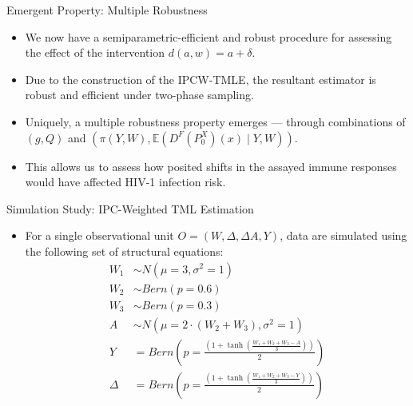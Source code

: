 \documentclass{beamer}
\newcommand{\E}{\mathbb{E}}
\begin{document}

\begin{frame}[c]{Emergent Property: Multiple Robustness}

\begin{center}
\begin{itemize}
  \itemsep10pt
  \item We now have a semiparametric-efficient and robust procedure for
    assessing the effect of the intervention $d(a,w) = a + \delta$.
  \item Due to the construction of the IPCW-TMLE, the resultant estimator is
    robust and efficient under two-phase sampling.
  \item Uniquely, a multiple robustness property emerges --- through
    combinations of $(g, Q)$ and $(\pi(Y, W), \E(D^F(P^X_0)(x) \mid Y, W))$.
  \item This allows us to assess how posited shifts in the assayed immune
    responses would have affected HIV-1 infection risk.
\end{itemize}
\end{center}

\note{
}

\end{frame}


\begin{frame}[c]{Simulation Study: IPC-Weighted TML Estimation}

\begin{center}
\begin{itemize}
  \itemsep10pt
  \item For a single observational unit $O = (W, \Delta, \Delta A, Y)$, data are
    simulated using the following set of structural equations:
    \begin{align*}
      W_1 & \sim N(\mu = 3, \sigma^2 = 1) \\
      W_2 & \sim Bern(p = 0.6) \\
      W_3 & \sim Bern(p = 0.3) \\
      A & \sim N(\mu = 2 \cdot (W_2 + W_3), \sigma^2 = 1) \\
      Y & = Bern \left(p = \frac{\left(1+ \tanh\left(\frac{W_1 + W_2 + W_3 -
                A}{3}\right)\right)}{2}\right) \\
      \Delta & = Bern \left(p = \frac{\left(1+ \tanh\left(\frac{W_1 + W_2 + W_3
                - Y}{3}\right)\right)}{2}\right)
     \end{align*}
\end{itemize}
\end{center}

\note{
}

\end{frame}
\end{document}
